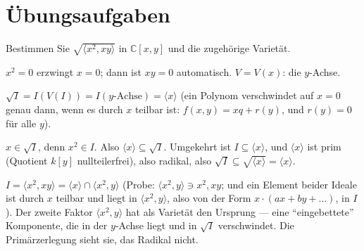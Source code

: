 \section{Übungsaufgaben}

\begin{aufgabe}
Bestimmen Sie $\sqrt{\langle x^{2}, xy\rangle}$ in $\mathbb C[x, y]$ und die zugehörige Varietät.

\loesung
{}
$x^{2} = 0$ erzwingt $x = 0$; dann ist $xy = 0$ automatisch. $V = V(x)$: die $y$-Achse.

$\sqrt I = I(V(I)) = I(\text{$y$-Achse}) = \langle x\rangle$ (ein Polynom verschwindet auf $x = 0$ genau dann, wenn es durch $x$ teilbar ist: $f(x, y) = xq + r(y)$, und $r(y) = 0$ für alle $y$).

$x\in\sqrt I$, denn $x^{2}\in I$. Also $\langle x\rangle\subseteq\sqrt I$. Umgekehrt ist $I\subseteq\langle x\rangle$, und $\langle x\rangle$ ist prim (Quotient $k[y]$ nullteilerfrei), also radikal, also $\sqrt I\subseteq\sqrt{\langle x\rangle} = \langle x\rangle$. \checkmark

$I = \langle x^{2}, xy\rangle = \langle x\rangle\cap\langle x^{2}, y\rangle$ (Probe: $\langle x^{2}, y\rangle\ni x^{2}, xy$; und ein Element beider Ideale ist durch $x$ teilbar und liegt in $\langle x^{2}, y\rangle$, also von der Form $x\cdot(ax + by + \ldots)$, in $I$). Der zweite Faktor $\langle x^{2}, y\rangle$ hat als Varietät den Ursprung --- eine \enquote{eingebettete} Komponente, die in der $y$-Achse liegt und in $\sqrt I$ verschwindet. Die Primärzerlegung sieht sie, das Radikal nicht.

\begin{center}
\begin{minipage}{0.88\textwidth}
\end{minipage}
\end{center}
\end{aufgabe}

